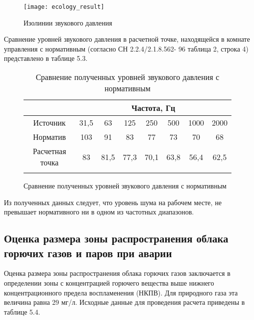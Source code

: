 \begin{figure}[H]
	\centering
	\texttt{[image: ecology\_result]}
	\caption{Изолинии звукового давления}
\end{figure}

Сравнение уровней звукового давления в расчетной точке, находящейся в комнате управления с нормативным (согласно СН 2.2.4/2.1.8.562-
96 таблица 2, строка 4) представлено в таблице 5.3.

\begin{figure}
	\begin{longtable}{|c|c|c|c|c|c|c|c|}
		\hline
		\multicolumn{1}{|c}{}& \multicolumn{7}{c|}{Частота, Гц} \\ \hline
		Источник & 31,5 & 63 & 125 & 250 & 500 & 1000 & 2000 \\ \hline
		Норматив & 103 & 91 & 83 & 77 & 73 & 70 & 68 \\ \hline
		Расчетная точка & 83 & 81,5 & 77,3 & 70,1 & 63,8 & 56,4 & 62,5 \\ \hline
		\caption{Сравнение полученных уровней звукового давления с нормативным} \label{tab:ecology_noise_norm}
	\end{longtable}
\end{figure}

Из полученных данных следует, что уровень шума на рабочем месте, не превышает нормативного ни в одном из частотных диапазонов.

\subsection{Оценка размера зоны распространения облака горючих газов и паров при аварии} %
\label{sub:ecology_cloud}

Оценка размера зоны распространения облака горючих газов заключается в определении зоны с концентрацией горючего вещества выше нижнего концентрационного предела воспламенения (НКПВ). Для природного газа эта величина равна 29 мг/л.
Исходные данные для проведения расчета приведены в таблице 5.4.

